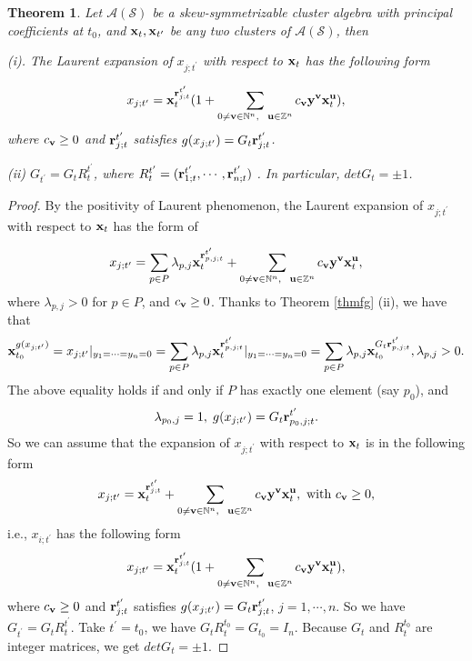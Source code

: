 \documentclass[14pt]{amsart}
\newtheorem{Theorem}{Theorem}[section]
\begin{document}
\begin{Theorem}\label{detgthm}
Let $\mathcal A(\mathcal S)$ be a skew-symmetrizable cluster algebra with principal coefficients at $t_0$, and ${\bf x}_t, {\bf x}_{t^{\prime}}$ be any two clusters of $\mathcal A(\mathcal S)$, then


(i). The Laurent expansion of  $x_{j;t^{\prime}}$ with respect to ${\bf x}_t$ has the following form

 $$x_{j;t^{\prime}}={\bf x}_{t}^{{\bf r}_{j;t}^{t^{\prime}}}(1+\sum\limits_{0\neq {\bf v}\in\mathbb N^n,~~{\bf u}\in\mathbb Z^n}c_{\bf v}{\bf y}^{\bf v}{\bf x}_t^{\bf u}),$$
where $c_{\bf v}\geq 0$ and ${\bf r}_{j;t}^{t^{\prime}}$ satisfies $g(x_{j;t^{\prime}})=G_t{\bf r}_{j;t}^{t^{\prime}}$.


(ii) $G_{t^{\prime}}=G_tR_{t}^{t^{\prime}}$, where $R_{t}^{t^{\prime}}=({\bf r}_{1;t}^{t^{\prime}},\cdots,{\bf r}_{n;t}^{t^{\prime}})$ . In particular, $det G_t=\pm1$.


\end{Theorem}


\begin{proof}
By  the positivity of  Laurent phenomenon, the Laurent expansion of  $x_{j;t^{\prime}}$ with respect to ${\bf x}_t$ has the form of

$$x_{j;t^{\prime}}=\sum\limits_{p\in P}\lambda_{p,j}{\bf x}_{t}^{{\bf r}_{p,j;t}^{t^\prime}}+\sum\limits_{0\neq {\bf v}\in\mathbb N^n,~~{\bf u}\in\mathbb Z^n}c_{\bf v}{\bf y}^{\bf v}{\bf x}_t^{\bf u},$$
where $\lambda_{p,j}>0$ for $p\in P$, and $c_{\bf v}\geq0$.
Thanks to Theorem \ref{thmfg} (ii), we have that
\begin{eqnarray}
{\bf x}_{t_0}^{g(x_{j;t^\prime})}=x_{j;t^{\prime}}|_{y_1=\cdots=y_n=0}=\sum\limits_{p\in P}\lambda_{p,j}{\bf x}_{t}^{{\bf r}_{p,j;t}^{t^\prime}}|_{y_1=\cdots=y_n=0}=
\sum\limits_{p\in P}\lambda_{p,j}{\bf x}_{t_0}^{G_t{\bf r}_{p,j;t}^{t^\prime}}, \lambda_{p,j}> 0.\nonumber
\end{eqnarray}
The above equality holds if and only if $P$ has exactly one element (say $p_0$), and
\begin{eqnarray}\label{coreqa}
\lambda_{p_0,j}=1,\; g(x_{j;t^\prime})=G_t{\bf r}_{p_0,j;t}^{t^\prime}.\nonumber
\end{eqnarray}
So we can assume that the  expansion of  $x_{j;t^{\prime}}$ with respect to ${\bf x}_t$ is in the following form
$$x_{j;t^{\prime}}={\bf x}_{t}^{{\bf r}_{j;t}^{t^\prime}}+\sum\limits_{0\neq {\bf v}\in\mathbb N^n,~~{\bf u}\in\mathbb Z^n}c_{\bf v}{\bf y}^{\bf v}{\bf x}_t^{\bf u},\text{ with }c_{\bf v}\geq 0,$$
i.e., $x_{i;t^{\prime}}$ has the following form $$x_{j;t^{\prime}}={\bf x}_{t}^{{\bf r}_{j;t}^{t^{\prime}}}(1+\sum\limits_{0\neq {\bf v}\in\mathbb N^n,~~{\bf u}\in\mathbb Z^n}c_{\bf v}{\bf y}^{\bf v}{\bf x}_t^{\bf u}),$$
where $c_{\bf v}\geq 0$ and ${\bf r}_{j;t}^{t^\prime}$ satisfies $g(x_{j;t^\prime})=G_t{\bf r}_{j;t}^{t^\prime}$, $j=1,\cdots,n$.
So we have $G_{t^{\prime}}=G_tR_{t}^{t^{\prime}}$.
Take $t^{\prime}=t_0$, we have $G_tR_{t}^{t_0}=G_{t_0}=I_n$. Because $G_t$ and $R_{t}^{t_0}$ are integer matrices, we get $det G_t=\pm1$.
\end{proof}
\end{document}
